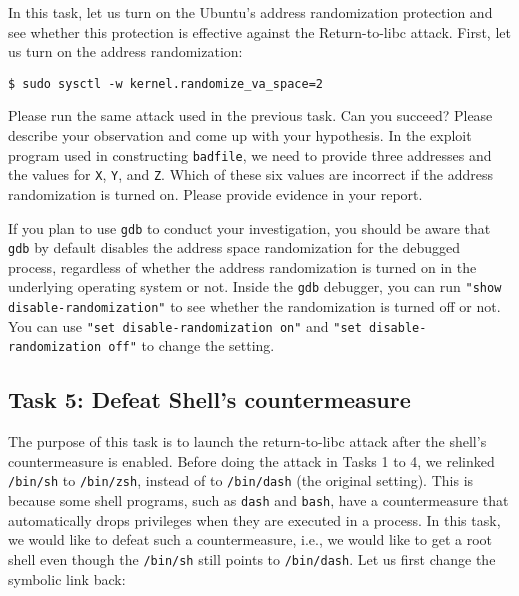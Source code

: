 In this task, let us turn on the Ubuntu's address randomization protection  
and see whether this protection is effective against 
the Return-to-libc attack. First, let us 
turn on the address randomization:  

\begin{lstlisting}
$ sudo sysctl -w kernel.randomize_va_space=2
\end{lstlisting}


Please run the same attack used in the previous task. Can you succeed? 
Please describe your observation and come up with your hypothesis. 
In the exploit program used in constructing \texttt{badfile}, we
need to provide three addresses and the values for \texttt{X}, \texttt{Y},
and \texttt{Z}. Which of these six values are incorrect if 
the address randomization is turned on. Please provide evidence in your
report. 


If you plan to use \texttt{gdb} to conduct your investigation, you should
be aware that \texttt{gdb} by default disables the address space randomization for the
debugged process, regardless of whether the address randomization is 
turned on in the underlying operating system or not. Inside the
\texttt{gdb} debugger, you can run \texttt{"show disable-randomization"} 
to see whether the randomization is turned off or not.
You can use \texttt{"set disable-randomization on"} and
\texttt{"set disable-randomization off"} to change the setting. 



\subsection{Task 5: Defeat Shell's countermeasure}

The purpose of this task is to launch the return-to-libc attack after 
the shell's countermeasure is enabled. 
Before doing the attack in Tasks 1 to 4, we relinked \texttt{/bin/sh} to \texttt{/bin/zsh},
instead of to \texttt{/bin/dash} (the original setting). This is because some shell programs, such 
as \texttt{dash} and \texttt{bash}, have a countermeasure that automatically 
drops privileges when they are executed in a \setuid process. In this task, we 
would like to defeat such a countermeasure, i.e., we would like to get a root shell even though
the \texttt{/bin/sh} still points to \texttt{/bin/dash}.   
Let us first change the symbolic link back:

